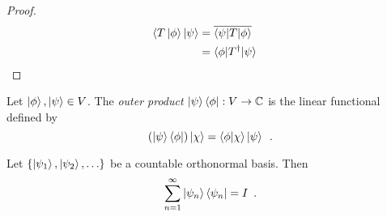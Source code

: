 \begin{proof}
\pf
\begin{align*}
\langle T \left| {\phi} \right\rangle | \psi \rangle & = \overline{\langle \psi | T | \phi \rangle} \\
& = \langle \phi | T^\dagger | \psi \rangle & \relax
\end{align*}
\end{proof}

\begin{df}
Let $\left| {\phi} \right\rangle, \left| {\psi} \right\rangle \in V$. The \emph{outer product} $\left| {\psi} \right\rangle \langle \phi | : V \rightarrow \mathbb{C}$ is the linear functional defined by
\[ (\left| {\psi} \right\rangle \langle \phi |) \left| {\chi} \right\rangle = \langle \phi | \chi \rangle \left| {\psi} \right\rangle \enspace . \]
\end{df}

\begin{prop}
Let $\{ \left| {\psi_1} \right\rangle, \left| {\psi_2} \right\rangle, \ldots \}$ be a countable orthonormal basis. Then
\[ \sum_{n=1}^\infty \left| {\psi_n} \right\rangle \langle \psi_n | = I \enspace . \]
\end{prop}